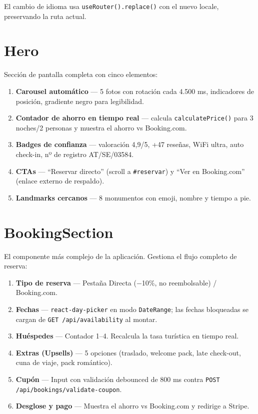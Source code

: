 \documentclass[12pt,a4paper,twoside,openright]{report}
\begin{document}
El cambio de idioma usa \texttt{useRouter().replace()} con el nuevo locale,
preservando la ruta actual.

\section{Hero}

Sección de pantalla completa con cinco elementos:

\begin{enumerate}
  \item \textbf{Carousel automático} — 5 fotos con rotación cada 4.500 ms, indicadores
        de posición, gradiente negro para legibilidad.
  \item \textbf{Contador de ahorro en tiempo real} — calcula \texttt{calculatePrice()}
        para 3 noches/2 personas y muestra el ahorro vs Booking.com.
  \item \textbf{Badges de confianza} — valoración 4,9/5, +47 reseñas, WiFi ultra, auto check-in,
        nº de registro AT/SE/03584.
  \item \textbf{CTAs} — ``Reservar directo'' (scroll a \texttt{\#reservar}) y
        ``Ver en Booking.com'' (enlace externo de respaldo).
  \item \textbf{Landmarks cercanos} — 8 monumentos con emoji, nombre y tiempo a pie.
\end{enumerate}

\section{BookingSection}

El componente más complejo de la aplicación. Gestiona el flujo completo de reserva:

\begin{enumerate}
  \item \textbf{Tipo de reserva} — Pestaña Directa (−10\%, no reembolsable) / Booking.com.
  \item \textbf{Fechas} — \texttt{react-day-picker} en modo \texttt{DateRange}; las fechas
        bloqueadas se cargan de \texttt{GET /api/availability} al montar.
  \item \textbf{Huéspedes} — Contador 1–4. Recalcula la tasa turística en tiempo real.
  \item \textbf{Extras (Upsells)} — 5 opciones (traslado, welcome pack, late check-out,
        cuna de viaje, pack romántico).
  \item \textbf{Cupón} — Input con validación debounced de 800 ms contra
        \texttt{POST /api/bookings/validate-coupon}.
  \item \textbf{Desglose y pago} — Muestra el ahorro vs Booking.com y redirige a Stripe.
\end{enumerate}
\end{document}

